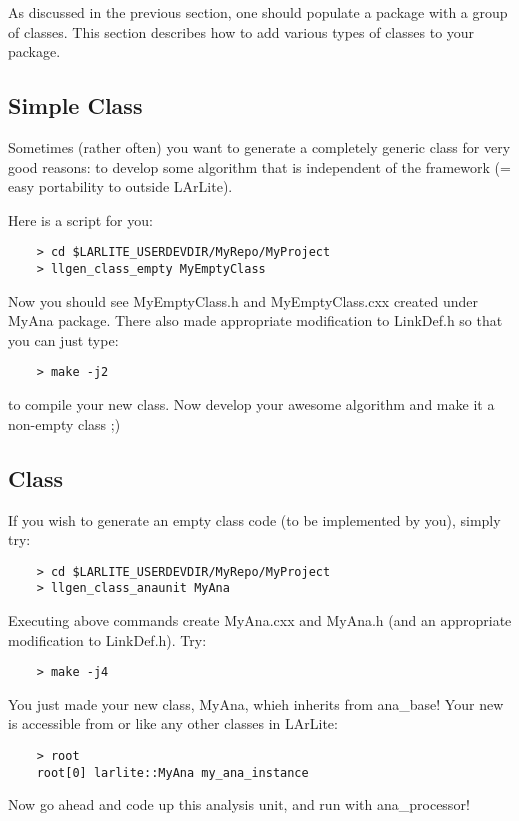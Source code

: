 
As discussed in the previous section, one should populate a package with a group of \CPP classes.
This section describes how to add various types of \CPP classes to your package.

\subsection{Simple \CPP Class}
Sometimes (rather often) you want to generate a completely generic \CPP class for very good reasons: to develop 
some algorithm that is independent of the framework (= easy portability to outside LArLite).

Here is a script for you:
\begin{lstlisting}
    > cd $LARLITE_USERDEVDIR/MyRepo/MyProject
    > llgen_class_empty MyEmptyClass
\end{lstlisting}
Now you should see {\ttfamily MyEmptyClass.h} and {\ttfamily MyEmptyClass.cxx} created under {\ttfamily MyAna}
package. There also made appropriate modification to {\ttfamily LinkDef.h} so that you can just type:
\begin{lstlisting}
    > make -j2
\end{lstlisting}
to compile your new class. Now develop your awesome algorithm and make it a non-empty class ;)

\subsection{\anaunit Class}
If you wish to generate an empty \anaunit class code (to be implemented by you), simply try:
\begin{lstlisting}
    > cd $LARLITE_USERDEVDIR/MyRepo/MyProject
    > llgen_class_anaunit MyAna
\end{lstlisting}

Executing above commands create {\ttfamily MyAna.cxx} and {\ttfamily MyAna.h} (and an appropriate modification to {\ttfamily LinkDef.h}).
Try:
\begin{lstlisting}
    > make -j4
\end{lstlisting}
You just made your new \anaunit class, {\ttfamily MyAna}, whieh inherits from {\ttfamily ana\_base}! 
Your new \anaunit is accessible from \CINT or \PyROOT like any other classes in LArLite:
\begin{lstlisting}
    > root
    root[0] larlite::MyAna my_ana_instance
\end{lstlisting}
Now go ahead and code up this analysis unit, and run with {\ttfamily ana\_processor}! 

